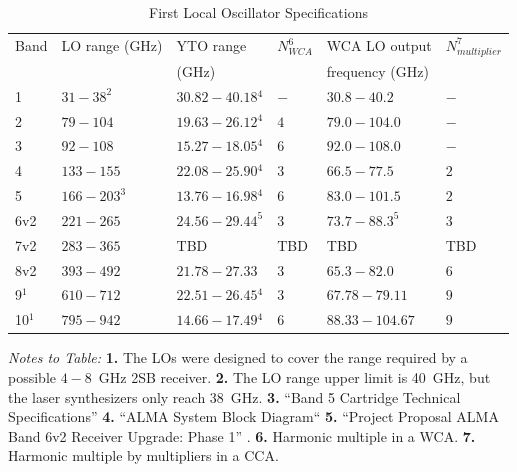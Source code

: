 \begin{table}[hbt]
    \centering
    \caption{First Local Oscillator Specifications}
    \label{tab:lo1_spec}
    \begin{tabular}{llllll}
        \hline
         Band & LO range (GHz) & YTO range & $N_{WCA}^6$ & \ac{WCA} LO output & $N_{multiplier}^7$\\
         & & (GHz) & & frequency (GHz) & \\
         \hline
         1 & $31-38^2$ & $30.82-40.18$$^4$ & $-$ & $30.8-40.2$ & $-$\\
         2 & $79-104$ & $19.63-26.12$$^4$ & $4$ & $79.0-104.0$ & $-$\\
         3 & $92-108$ & $15.27-18.05$$^4$ & $6$ & $92.0-108.0$ & $-$\\
         4 & $133-155$ & $22.08-25.90$$^4$ & $3$ & $66.5-77.5$ & $2$\\
         5 & $166-203^3$ & $13.76-16.98$$^4$ & $6$ & $83.0-101.5$ & $2$\\
         6v2 & $221-265$ & $24.56-29.44^5$ & $3$ & $73.7-88.3^5$ & $3$\\
         7v2 & $283-365$ & TBD & TBD & TBD & TBD \\
         8v2 & $393-492$ & $21.78-27.33$ & $3$ & $65.3-82.0$ & $6$\\
         9$^1$ & $610-712$ & $22.51-26.45$$^4$ & $3$ & $67.78-79.11$ & $9$\\
         10$^1$ & $795-942$ & $14.66-17.49$$^4$ & $6$ & $88.33-104.67$ & $9$\\
         \hline
    \end{tabular}
    \begin{minipage}{\textwidth}
    \small
    \vspace*{0.5em}
    \textit{Notes to Table:}
        \textbf{1.} The LOs were designed to cover the range required by a possible $4-8$~GHz 2SB receiver.
        \textbf{2.} The LO range upper limit is 40~GHz, but the laser synthesizers only reach 38~GHz.
        \textbf{3.} ``Band 5 Cartridge Technical Specifications'' \cite{band5_spe}
        \textbf{4.} ``ALMA System Block Diagram`` \cite{alma_sbd}
        \textbf{5.} ``Project Proposal ALMA Band 6v2 Receiver Upgrade: Phase 1'' \cite{band6v2_pp}.
        \textbf{6.} Harmonic multiple in a \ac{WCA}.
        \textbf{7.} Harmonic multiple by multipliers in a \ac{CCA}.
    \end{minipage}
\end{table}

